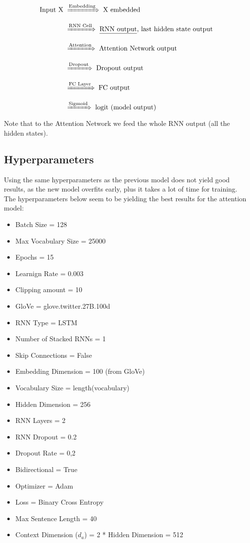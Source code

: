 \documentclass[12pt]{report}
\begin{document}
\begin{align*}
    \text{Input X} &\;\xRightarrow[]{\text{Embedding}}\; \text{X embedded} \\[1.35ex]
                   &\;\xRightarrow[]{\text{RNN Cell}}\; \text{\underline{RNN output},
                                                    last hidden state output} \\[1.35ex]
                   &\;\xRightarrow[]{\text{Attention}}\; \text{Attention Network output} \\[1.35ex]
                   &\;\xRightarrow[]{\text{Dropout}}\; \text{Dropout output} \\[1.35ex]
                   &\;\xRightarrow[]{\text{FC Layer}}\; \text{FC output} \\[1.35ex]
                   &\;\xRightarrow[]{\text{Sigmoid}}\; \text{logit (model output)}
\end{align*}
Note that to the Attention Network we feed the whole RNN output (all the hidden states).
\clearpage


\subsection*{Hyperparameters}
Using the same hyperparameters as the previous model does not yield good results, as the new
model overfits early, plus it takes a lot of time for training. The hyperparameters below
seem to be yielding the best results for the attention model:
\bigskip

\begin{itemize}
    \item Batch Size = 128
    \item Max Vocabulary Size = 25000
    \item Epochs = 15
    \item Learnign Rate = 0.003
    \item Clipping amount = 10
    \item GloVe = glove.twitter.27B.100d
    \item RNN Type = LSTM
    \item Number of Stacked RNNs = 1
    \item Skip Connections = False
    \item Embedding Dimension = 100 (from GloVe)
    \item Vocabulary Size = length(vocabulary)
    \item Hidden Dimension = 256
    \item RNN Layers = 2
    \item RNN Dropout = 0.2
    \item Dropout Rate = 0,2
    \item Bidirectional = True
    \item Optimizer = Adam
    \item Loss = Binary Cross Entropy
    \item Max Sentence Length = 40
    \item Context Dimension ($d_a$) = 2 * Hidden Dimension = 512
\end{itemize} \clearpage
\end{document}
